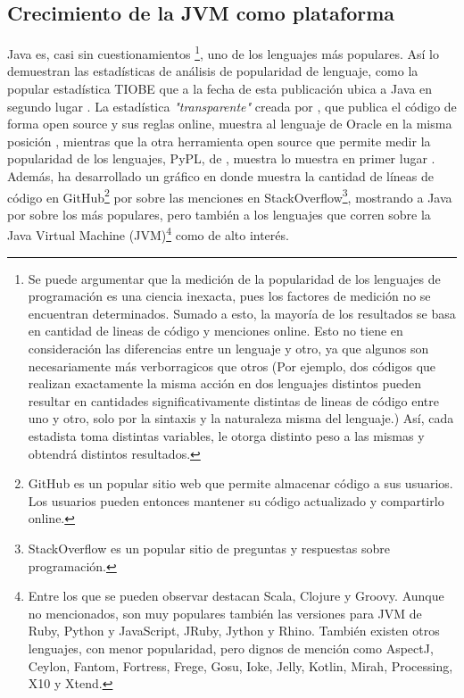 \subsection{Crecimiento de la JVM como plataforma}

Java es, casi sin cuestionamientos \footnote{
	Se puede argumentar que la medición de la popularidad de
	los lenguajes de programación es una ciencia inexacta, pues los factores de medición no
	se encuentran determinados. Sumado a esto, la mayoría de los resultados se basa en
	cantidad de lineas de código y menciones online. Esto no tiene en consideración las
	diferencias entre un lenguaje y otro, ya que algunos son necesariamente más
	verborragicos que otros (Por ejemplo, dos códigos que realizan exactamente la misma
	acción en dos lenguajes distintos pueden resultar en cantidades significativamente
	distintas de lineas de código entre uno y otro, solo por la sintaxis y la naturaleza
	misma del lenguaje.) Así, cada estadista toma distintas variables, le otorga distinto
	peso a las mismas y obtendrá distintos resultados.
}, uno de los lenguajes más populares. Así lo demuestran las estadísticas de análisis de
popularidad de lenguaje, como la popular estadística TIOBE que a la fecha de esta
publicación ubica a Java en segundo lugar . La estadística
\emph{"transparente"} creada por , que publica el
código de forma open source y sus reglas online, muestra al lenguaje de Oracle en la misma
posición , mientras que la otra herramienta open source que
permite medir la popularidad de los lenguajes, PyPL, de
, muestra lo muestra en primer lugar
.\\
Además,  ha desarrollado un gráfico en donde muestra la
cantidad de líneas de código en GitHub\footnote{
	GitHub es un popular sitio web que permite almacenar código a sus usuarios. Los usuarios
	pueden entonces mantener su código actualizado y compartirlo online.
} por sobre las menciones en StackOverflow\footnote{
StackOverflow es un popular sitio de preguntas y respuestas sobre programación.
}, mostrando a Java por sobre los más populares, pero también a los lenguajes que corren
sobre la Java Virtual Machine (JVM)\footnote{
	Entre los que se pueden observar destacan Scala, Clojure y Groovy. Aunque no
	mencionados, son muy populares también las versiones para JVM de Ruby, Python y
	JavaScript, JRuby, Jython y Rhino. También existen otros lenguajes, con menor
	popularidad, pero dignos de mención como AspectJ, Ceylon, Fantom, Fortress, Frege, Gosu,
	Ioke, Jelly, Kotlin, Mirah, Processing, X10 y Xtend.
} como de alto interés.\\
